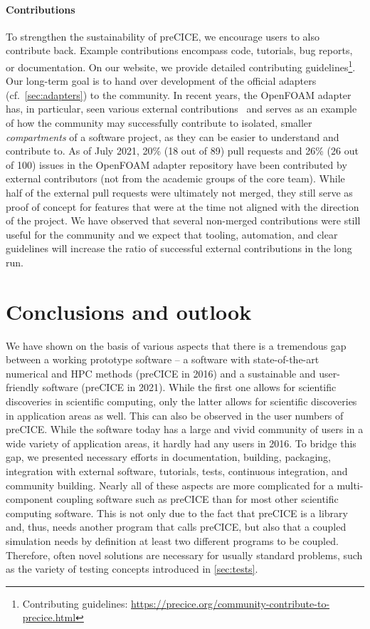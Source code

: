 \paragraph{Contributions}
To strengthen the sustainability of preCICE, we encourage users to also contribute back. Example contributions encompass code, tutorials, bug reports, or documentation. On our website, we provide detailed contributing guidelines\footnote{Contributing guidelines: \url{https://precice.org/community-contribute-to-precice.html}}. Our long-term goal is to hand over development of the official adapters (cf.~\autoref{sec:adapters}) to the community. In recent years, the OpenFOAM adapter has, in particular, seen various external contributions~\cite{nlrse19-chourdakis} and serves as an example of how the community may successfully contribute to isolated, smaller \emph{compartments} of a software project, as they can be easier to understand and contribute to. As of July 2021, 20\% (18 out of 89) pull requests and 26\% (26 out of 100) issues in the OpenFOAM adapter repository have been contributed by external contributors (not from the academic groups of the core team). While half of the external pull requests were ultimately not merged, they still serve as proof of concept for features that were at the time not aligned with the direction of the project. We have observed that several non-merged contributions were still useful for the community and we expect that tooling, automation, and clear guidelines will increase the ratio of successful external contributions in the long run.





 
  \section{Conclusions and outlook}
\label{sec:conclusion}



We have shown on the basis of various aspects that there is a tremendous gap between a working prototype software -- a software with state-of-the-art numerical and HPC methods (preCICE in 2016) and a sustainable and user-friendly software (preCICE in 2021). While the first one allows for scientific discoveries in scientific computing, only the latter allows for scientific discoveries in application areas as well. This can also be observed in the user numbers of preCICE. While the software today has a large and vivid community of users in a wide variety of application areas, it hardly had any users in 2016.
To bridge this gap, we presented necessary efforts in documentation, building, packaging, integration with external software, tutorials, tests, continuous integration, and community building.
Nearly all of these aspects are more complicated for a multi-component coupling software such as preCICE than for most other scientific computing software. This is not only due to the fact that preCICE is a library and, thus, needs another program that calls preCICE, but also that a coupled simulation needs by definition at least two different programs to be coupled. Therefore, often novel solutions are necessary for usually standard problems, such as the variety of testing concepts introduced in \autoref{sec:tests}.  

